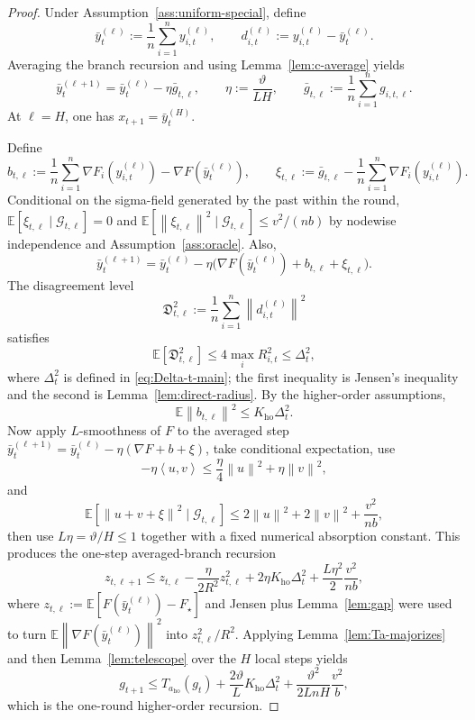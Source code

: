 \documentclass{article}
\theoremstyle{definition}
\newcommand{\EE}{\mathbb E}
\newcommand{\norm}[1]{\left\lVert #1\right\rVert}
\newcommand{\ip}[2]{\left\langle #1,#2\right\rangle}
\begin{document}
\begin{proof}
Under Assumption~\ref{ass:uniform-special}, define
\[
\bar y_t^{(\ell)}:=\frac1n\sum_{i=1}^n y_{i,t}^{(\ell)},
\qquad
d_{i,t}^{(\ell)}:=y_{i,t}^{(\ell)}-\bar y_t^{(\ell)}.
\]
Averaging the branch recursion and using Lemma~\ref{lem:c-average} yields
\[
\bar y_t^{(\ell+1)}=\bar y_t^{(\ell)}-\eta\bar g_{t,\ell},
\qquad
\eta:=\frac{\vartheta}{LH},
\qquad
\bar g_{t,\ell}:=\frac1n\sum_{i=1}^n g_{i,t,\ell}.
\]
At $\ell=H$, one has $x_{t+1}=\bar y_t^{(H)}$.

Define
\[
b_{t,\ell}:=\frac1n\sum_{i=1}^n \nabla F_i(y_{i,t}^{(\ell)})-\nabla F(\bar y_t^{(\ell)}),
\qquad
\xi_{t,\ell}:=\bar g_{t,\ell}-\frac1n\sum_{i=1}^n \nabla F_i(y_{i,t}^{(\ell)}).
\]
Conditional on the sigma-field generated by the past within the round,
$\EE[\xi_{t,\ell}\mid \mathcal G_{t,\ell}]=0$ and
$\EE[\norm{\xi_{t,\ell}}^2\mid \mathcal G_{t,\ell}]\le v^2/(nb)$ by
nodewise independence and Assumption~\ref{ass:oracle}. Also,
\[
\bar y_t^{(\ell+1)}
=
\bar y_t^{(\ell)}-\eta\bigl(\nabla F(\bar y_t^{(\ell)})+b_{t,\ell}+\xi_{t,\ell}\bigr).
\]
The disagreement level
\[
\mathfrak D_{t,\ell}^2:=\frac1n\sum_{i=1}^n\norm{d_{i,t}^{(\ell)}}^2
\]
satisfies
\[
\EE[\mathfrak D_{t,\ell}^2]\le 4\max_i R_{i,t}^2
\le
\Delta_t^2,
\]
where $\Delta_t^2$ is defined in \eqref{eq:Delta-t-main}; the first inequality
is Jensen's inequality and the second is Lemma~\ref{lem:direct-radius}. By the
higher-order assumptions,
\[
\EE\norm{b_{t,\ell}}^2\le K_{\mathrm{ho}}\Delta_t^2.
\]
Now apply $L$-smoothness of $F$ to the averaged step
$\bar y_t^{(\ell+1)}=\bar y_t^{(\ell)}-\eta(\nabla F+b+\xi)$, take conditional
expectation, use
\[
-\eta\ip{u}{v}\le \frac{\eta}{4}\norm{u}^2+\eta\norm{v}^2,
\]
and
\[
\EE[\norm{u+v+\xi}^2\mid\mathcal G_{t,\ell}]
\le
2\norm{u}^2+2\norm{v}^2+\frac{v^2}{nb},
\]
then use $L\eta=\vartheta/H\le 1$ together with a fixed numerical absorption constant. This
produces the one-step averaged-branch recursion
\[
z_{t,\ell+1}
\le
z_{t,\ell}-\frac{\eta}{2R^2}z_{t,\ell}^2+2\eta K_{\mathrm{ho}}\Delta_t^2+
\frac{L\eta^2}{2}\frac{v^2}{nb},
\]
where $z_{t,\ell}:=\EE[F(\bar y_t^{(\ell)})-F_\star]$ and Jensen plus
Lemma~\ref{lem:gap} were used to turn
$\EE\norm{\nabla F(\bar y_t^{(\ell)})}^2$ into $z_{t,\ell}^2/R^2$. Applying
Lemma~\ref{lem:Ta-majorizes} and then Lemma~\ref{lem:telescope} over the $H$
local steps yields
\[
g_{t+1}
\le
T_{a_{\mathrm{ho}}}(g_t)
+
\frac{2\vartheta}{L}K_{\mathrm{ho}}\Delta_t^2
+
\frac{\vartheta^2}{2L n H}\frac{v^2}{b},
\]
which is the one-round higher-order recursion.


\end{proof}
\end{document}
